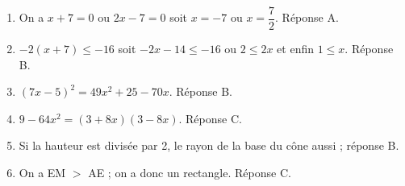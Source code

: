 \documentclass[10pt]{article}
\begin{document}
% 
\begin{enumerate}
\item On a $x+7 = 0$ ou $2x-7=0$ soit $x = - 7$ ou $x = \dfrac{7}{2}$. Réponse A.
\item $- 2(x+7) \leqslant - 16$ soit $- 2x - 14 \leqslant - 16$ ou $2 \leqslant 2x$ et enfin $1 \leqslant x$. Réponse B.
\item $(7x - 5)^2 = 49x^2 + 25 - 70x$. Réponse B.
\item $9 - 64x^2 = (3 + 8x)(3 - 8x)$. Réponse C.
\item Si la hauteur est divisée par 2, le rayon de la base du cône aussi ; réponse B.
\item On a EM $>$ AE ; on a donc un rectangle. Réponse C.
\end{enumerate}

\bigskip
\end{document}

